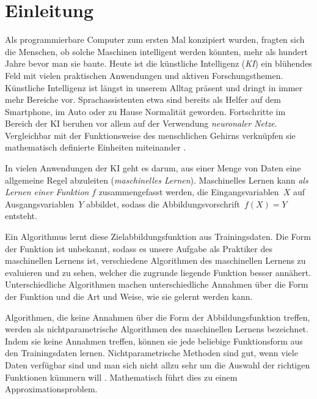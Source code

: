 \chapter*{Einleitung}

Als programmierbare Computer zum ersten Mal konzipiert wurden, fragten sich die Menschen, ob solche Maschinen intelligent werden könnten, mehr als hundert Jahre bevor man sie baute. Heute ist die künstliche Intelligenz (\emph{KI}) ein blühendes Feld mit vielen praktischen Anwendungen und aktiven Forschungsthemen. 
Künstliche Intelligenz ist längst in unserem Alltag präsent und dringt in immer mehr Bereiche vor. Sprachassistenten etwa sind bereits als Helfer auf dem Smartphone, im Auto oder zu Hause Normalität geworden. Fortschritte im Bereich der KI beruhen vor allem auf der Verwendung \emph{neuronaler Netze}. Vergleichbar mit der Funktionsweise des menschlichen Gehirns verknüpfen sie mathematisch definierte Einheiten miteinander \cite{goodfellow2016deep}.

In vielen Anwendungen der KI geht es darum, aus einer Menge von Daten eine allgemeine Regel abzuleiten (\emph{maschinelles Lernen}). Maschinelles Lernen kann \emph{als Lernen einer Funktion} $f$ zusammengefasst werden, die Eingangsvariablen~$X$ auf Ausgangsvariablen~$Y$ abbildet, sodass die Abbildungsvorschrift~$f(X) = Y$ entsteht.

Ein Algorithmus lernt diese Zielabbildungsfunktion aus Trainingsdaten.
Die Form der Funktion ist unbekannt, sodass es unsere Aufgabe als Praktiker des maschinellen Lernens ist, verschiedene Algorithmen des maschinellen Lernens zu evaluieren und zu sehen, welcher die zugrunde liegende Funktion besser annähert.
Unterschiedliche Algorithmen machen unterschiedliche Annahmen über die Form der Funktion und die Art und Weise, wie sie gelernt werden kann.

Algorithmen, die keine Annahmen über die Form der Abbildungsfunktion treffen, werden als nichtparametrische Algorithmen des maschinellen Lernens bezeichnet. Indem sie keine Annahmen treffen, können sie jede beliebige Funktionsform aus den Trainingsdaten lernen.
Nichtparametrische Methoden sind gut, wenn viele Daten verfügbar sind und man sich nicht allzu sehr um die Auswahl der richtigen Funktionen kümmern will \cite[Seite~757]{AI}. Mathematisch führt dies zu einem Approximationsproblem. 


